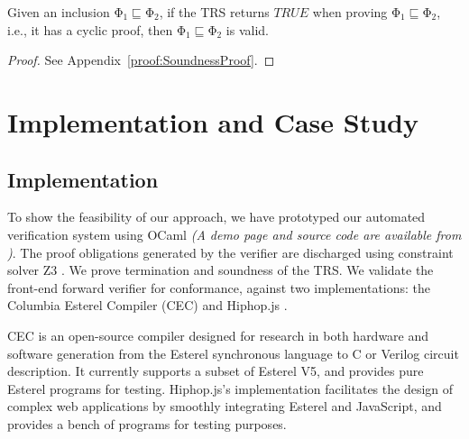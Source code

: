 \documentclass[acmsmall,10pt,review]{acmart}
\newcommand{\effect}{{\ensuremath{\mathrm{\Phi}}}}
\newcommand{\code}[1]{{\tt{\ensuremath{\m{#1}}}}}
\newcommand{\CONTAIN}{\sqsubseteq}
\newcommand{\m}{\mathit}
\newcommand\appref[1]{Appendix~\textcolor{blue}{\ref{#1}}}
\begin{document}
{ \begin{theorem}[Soundness]\label{Cyclicsoundness}
Given an inclusion \code{\effect_1 \CONTAIN \effect_2}, if the TRS returns \code{TRUE} when proving \code{\effect_1 \CONTAIN \effect_2}, i.e., it has a cyclic proof, 
then \code{\effect_1 \CONTAIN \effect_2} is valid.
\end{theorem}


\begin{proof}
See %
\appref{proof:SoundnessProof}.
\end{proof}






\section{Implementation and Case Study}
\label{sec:Evaluation}

\subsection{Implementation}
To show the feasibility of our approach, we have prototyped our automated verification system 
using OCaml \emph{(A demo page  and source code are available from \cite{CODE})}. 
The proof obligations generated by the verifier are discharged using constraint solver Z3 \citep{DBLP:conf/tacas/MouraB08}. 
We prove termination and soundness of the TRS. We validate the front-end forward verifier for conformance, against two implementations: the Columbia Esterel Compiler (CEC) 
\cite{CEC} and Hiphop.js \cite{HH_im}. 


CEC is an open-source compiler designed for research in both hardware and software generation from the Esterel synchronous language to C or Verilog circuit description. It currently supports a subset of Esterel V5, and provides pure Esterel programs for testing. Hiphop.js's implementation facilitates the design of complex web applications by smoothly integrating Esterel and JavaScript, and provides a bench of programs for testing purposes. 





}
\end{document}

